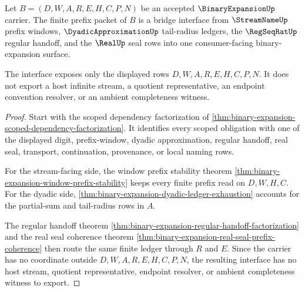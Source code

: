\begin{theorem}
\label{thm:binary-expansion-bridge-interface}
Let $B=(D,W,A,R,E,H,C,P,N)$ be an accepted $\BinaryExpansionUp$ carrier. The finite prefix packet of $B$ is a bridge interface from $\StreamNameUp$ prefix windows, $\DyadicApproximationUp$ tail-radius ledgers, the $\RegSeqRatUp$ regular handoff, and the $\RealUp$ seal rows into one consumer-facing binary-expansion surface.

The interface exposes only the displayed rows $D,W,A,R,E,H,C,P,N$. It does not export a host infinite stream, a quotient representative, an endpoint convention resolver, or an ambient completeness witness.
\end{theorem}
\begin{proof}
Start with the scoped dependency factorization of \autoref{thm:binary-expansion-scoped-dependency-factorization}. It identifies every scoped obligation with one of the displayed digit, prefix-window, dyadic approximation, regular handoff, real seal, transport, continuation, provenance, or local naming rows.

For the stream-facing side, the window prefix stability theorem \autoref{thm:binary-expansion-window-prefix-stability} keeps every finite prefix read on $D,W,H,C$. For the dyadic side, \autoref{thm:binary-expansion-dyadic-ledger-exhaustion} accounts for the partial-sum and tail-radius rows in $A$.

The regular handoff theorem \autoref{thm:binary-expansion-regular-handoff-factorization} and the real seal coherence theorem \autoref{thm:binary-expansion-real-seal-prefix-coherence} then route the same finite ledger through $R$ and $E$. Since the carrier has no coordinate outside $D,W,A,R,E,H,C,P,N$, the resulting interface has no host stream, quotient representative, endpoint resolver, or ambient completeness witness to export.
\end{proof}


